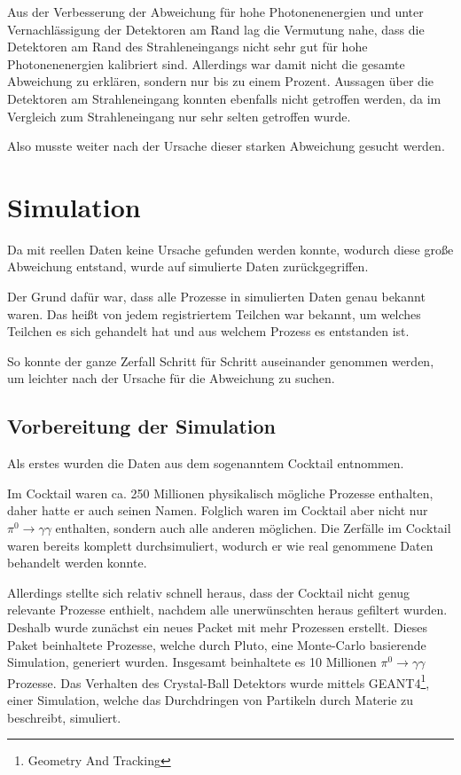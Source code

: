 \documentclass[a4paper,11pt,oneside,final,german,openbib,pdftex]{scrbook}
\begin{document}
{Aus der Verbesserung der Abweichung f\"ur hohe Photonenenergien und unter Vernachl\"assigung der Detektoren am Rand lag die Vermutung nahe, dass die Detektoren am Rand des Strahleneingangs nicht sehr gut f\"ur hohe Photonenenergien kalibriert sind. 
Allerdings war damit nicht die gesamte Abweichung zu erkl\"aren, sondern nur bis zu einem Prozent. 
Aussagen \"uber die Detektoren am Strahleneingang konnten ebenfalls nicht getroffen werden, da im Vergleich zum Strahleneingang nur sehr selten getroffen wurde.

Also musste weiter nach der Ursache dieser starken Abweichung gesucht werden.


\section{Simulation}
\label{sec:Simulation}

Da mit reellen Daten keine Ursache gefunden werden konnte, wodurch diese gro{\ss}e Abweichung entstand, wurde auf simulierte Daten zur\"uckgegriffen. 

Der Grund daf\"ur war, dass alle Prozesse in simulierten Daten genau bekannt waren. Das hei{\ss}t von jedem registriertem Teilchen war bekannt, um welches Teilchen es sich gehandelt hat und aus welchem Prozess es entstanden ist. 

So konnte der ganze Zerfall Schritt f\"ur Schritt auseinander genommen werden, um leichter nach der Ursache f\"ur die Abweichung zu suchen.

\subsection{Vorbereitung der Simulation}
\label{sec:Vorbereitung-der-Simulation}

Als erstes wurden die Daten aus dem sogenanntem Cocktail entnommen.

Im Cocktail waren ca. 250 Millionen physikalisch m\"ogliche Prozesse enthalten, daher hatte er auch seinen Namen. Folglich waren im Cocktail aber nicht nur $\pi^0 \rightarrow \gamma \gamma$ enthalten, sondern auch alle anderen m\"oglichen. Die Zerf\"alle im Cocktail waren bereits komplett durchsimuliert, wodurch er wie real genommene Daten behandelt werden konnte.

Allerdings stellte sich relativ schnell heraus, dass der Cocktail nicht genug relevante Prozesse enthielt, nachdem alle unerw\"unschten heraus gefiltert wurden. 
Deshalb wurde zun\"achst ein neues Packet mit mehr Prozessen erstellt. 
Dieses Paket beinhaltete Prozesse, welche durch Pluto, eine Monte-Carlo basierende Simulation, generiert wurden. Insgesamt beinhaltete es 10 Millionen $\pi^0 \rightarrow \gamma \gamma$ Prozesse. Das Verhalten des Crystal-Ball Detektors wurde mittels GEANT4\footnote{Geometry And Tracking}, einer Simulation, welche das Durchdringen von Partikeln durch Materie zu beschreibt, simuliert.

}
\end{document}
